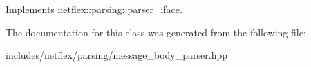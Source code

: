 Implements \hyperlink{classnetflex_1_1parsing_1_1parser__iface_a6b092567e70a5c0bf7568e94d06f7154}{netflex\+::parsing\+::parser\+\_\+iface}.



The documentation for this class was generated from the following file\+:\begin{DoxyCompactItemize}
\item 
includes/netflex/parsing/message\+\_\+body\+\_\+parser.\+hpp\end{DoxyCompactItemize}
